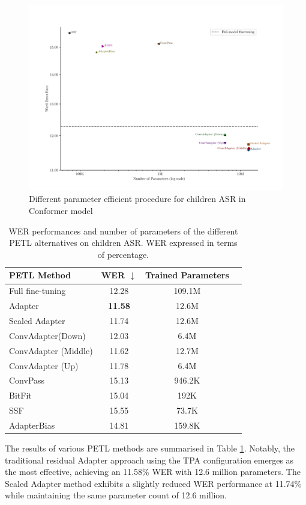 \begin{figure}[h]
    \begin{center}
        \includegraphics[width=\textwidth]{imgs/Adapter_compare_withoutWide.png}
        \caption{Different parameter efficient procedure for children ASR in Conformer model}
        \label{fig:adapter_compared_withoutWide}
    \end{center}
\end{figure}
\begin{table}[h]
    \centering
    \begin{tabular}{lccc}
        \toprule
        \textbf{PETL Method} & \textbf{WER $\downarrow$} & \textbf{Trained Parameters} \\
        \midrule
        Full fine-tuning & 12.28 & 109.1M \\ \hline
        Adapter & \textbf{11.58} & 12.6M \\
        Scaled Adapter & 11.74 & 12.6M \\
        ConvAdapter(Down) & 12.03 & 6.4M \\
        ConvAdapter (Middle) & 11.62 & 12.7M \\
        ConvAdapter (Up) & 11.78 & 6.4M \\
        ConvPass & 15.13 & 946.2K \\
        BitFit & 15.04 & 192K \\
        SSF & 15.55 & 73.7K \\
        AdapterBias & 14.81 & 159.8K \\
        \bottomrule
    \end{tabular}
    \caption{WER performances and number of parameters of the different PETL alternatives on children ASR. WER expressed in terms of percentage.}
    \label{tab:PETL_alternatives}
\end{table}
The results of various \ac{PETL} methods are summarised in Table \ref{tab:PETL_alternatives}. Notably, the traditional residual Adapter approach using the \ac{TPA} configuration emerges as the most effective, achieving an 11.58\% \ac{WER} with 12.6 million parameters. The Scaled Adapter method exhibits a slightly reduced \ac{WER} performance at 11.74\% while maintaining the same parameter count of 12.6 million.

